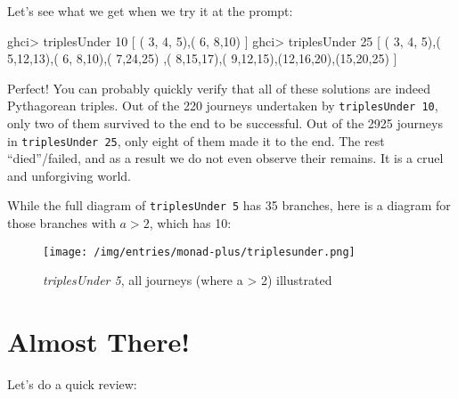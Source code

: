 \documentclass[]{article}
\newenvironment{Shaded}{}{}
\newcommand{\DecValTok}[1]{\textcolor[rgb]{0.25,0.63,0.44}{{#1}}}
\newcommand{\FunctionTok}[1]{\textcolor[rgb]{0.02,0.16,0.49}{{#1}}}
\newcommand{\NormalTok}[1]{{#1}}
\begin{document}
Let's see what we get when we try it at the prompt:

\begin{Shaded}
\begin{Highlighting}[]
\NormalTok{ghci}\FunctionTok{>} \NormalTok{triplesUnder }\DecValTok{10}
\NormalTok{[ ( }\DecValTok{3}\NormalTok{, }\DecValTok{4}\NormalTok{, }\DecValTok{5}\NormalTok{),( }\DecValTok{6}\NormalTok{, }\DecValTok{8}\NormalTok{,}\DecValTok{10}\NormalTok{) ]}
\NormalTok{ghci}\FunctionTok{>} \NormalTok{triplesUnder }\DecValTok{25}
\NormalTok{[ ( }\DecValTok{3}\NormalTok{, }\DecValTok{4}\NormalTok{, }\DecValTok{5}\NormalTok{),( }\DecValTok{5}\NormalTok{,}\DecValTok{12}\NormalTok{,}\DecValTok{13}\NormalTok{),( }\DecValTok{6}\NormalTok{, }\DecValTok{8}\NormalTok{,}\DecValTok{10}\NormalTok{),( }\DecValTok{7}\NormalTok{,}\DecValTok{24}\NormalTok{,}\DecValTok{25}\NormalTok{)}
 \NormalTok{,( }\DecValTok{8}\NormalTok{,}\DecValTok{15}\NormalTok{,}\DecValTok{17}\NormalTok{),( }\DecValTok{9}\NormalTok{,}\DecValTok{12}\NormalTok{,}\DecValTok{15}\NormalTok{),(}\DecValTok{12}\NormalTok{,}\DecValTok{16}\NormalTok{,}\DecValTok{20}\NormalTok{),(}\DecValTok{15}\NormalTok{,}\DecValTok{20}\NormalTok{,}\DecValTok{25}\NormalTok{) ]}
\end{Highlighting}
\end{Shaded}

Perfect! You can probably quickly verify that all of these solutions are
indeed Pythagorean triples. Out of the 220 journeys undertaken by
\texttt{triplesUnder\ 10}, only two of them survived to the end to be
successful. Out of the 2925 journeys in \texttt{triplesUnder\ 25}, only
eight of them made it to the end. The rest ``died''/failed, and as a
result we do not even observe their remains. It is a cruel and
unforgiving world.

While the full diagram of \texttt{triplesUnder\ 5} has 35 branches, here
is a diagram for those branches with \(a > 2\), which has 10:

\begin{figure}[htbp]
\centering
\texttt{[image: /img/entries/monad-plus/triplesunder.png]}
\caption{\emph{triplesUnder 5}, all journeys (where a \textgreater{} 2)
illustrated}
\end{figure}

\section{Almost There!}\label{almost-there}

Let's do a quick review:
\end{document}

